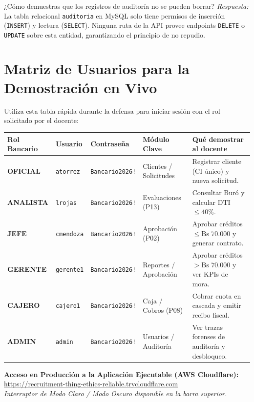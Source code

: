 \documentclass[11pt,letterpaper]{article}
\begin{document}
\begin{preguntatrampabox}{¿Cómo demuestras que los registros de auditoría no se pueden borrar?}
\textit{Respuesta:} La tabla relacional \texttt{auditoria} en MySQL solo tiene permisos de inserción (\texttt{INSERT}) y lectura (\texttt{SELECT}). Ninguna ruta de la API provee endpoints \texttt{DELETE} o \texttt{UPDATE} sobre esta entidad, garantizando el principio de no repudio.
\end{preguntatrampabox}

\vspace{0.2cm}
\section{Matriz de Usuarios para la Demostración en Vivo}

\noindent Utiliza esta tabla rápida durante la defensa para iniciar sesión con el rol solicitado por el docente:

\begin{center}
\small
\begin{tabular}{lllll}
\toprule
\textbf{Rol Bancario} & \textbf{Usuario} & \textbf{Contraseña} & \textbf{Módulo Clave} & \textbf{Qué demostrar al docente} \\
\midrule
\textbf{OFICIAL} & \texttt{atorrez} & \texttt{Bancario2026!} & Clientes / Solicitudes & Registrar cliente (CI único) y nueva solicitud. \\
\textbf{ANALISTA} & \texttt{lrojas} & \texttt{Bancario2026!} & Evaluaciones (P13) & Consultar Buró y calcular DTI $\le 40\%$. \\
\textbf{JEFE} & \texttt{cmendoza} & \texttt{Bancario2026!} & Aprobación (P02) & Aprobar créditos $\le \text{Bs } 70.000$ y generar contrato. \\
\textbf{GERENTE} & \texttt{gerente1} & \texttt{Bancario2026!} & Reportes / Aprobación & Aprobar créditos $> \text{Bs } 70.000$ y ver KPIs de mora. \\
\textbf{CAJERO} & \texttt{cajero1} & \texttt{Bancario2026!} & Caja / Cobros (P08) & Cobrar cuota en cascada y emitir recibo fiscal. \\
\textbf{ADMIN} & \texttt{admin} & \texttt{Bancario2026!} & Usuarios / Auditoría & Ver trazas forenses de auditoría y desbloqueo. \\
\bottomrule
\end{tabular}
\end{center}

\vspace{0.2cm}
\begin{tcolorbox}[colback=bankdark,colframe=bankpurple,arc=3mm,center,width=\textwidth]
    \centering\small\color{white}
    \textbf{Acceso en Producción a la Aplicación Ejecutable (AWS Cloudflare):}\\
    \url{https://recruitment-thing-ethics-reliable.trycloudflare.com}\\
    \textit{Interruptor de Modo Claro / Modo Oscuro disponible en la barra superior.}
\end{tcolorbox}
\end{document}
